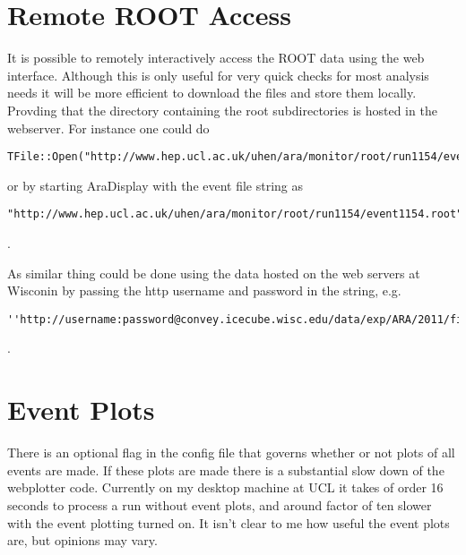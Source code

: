 \documentclass[letterpaper]{article}  %
\begin{document}
\section{Remote ROOT Access}
It is possible to remotely interactively access the ROOT data using the web interface. Although this is only useful for very quick checks for most analysis needs it will be more efficient to download the files and store them locally. Provding that the directory containing the root subdirectories is hosted in the webserver. For instance one could do \\ \begin{verbatim}TFile::Open("http://www.hep.ucl.ac.uk/uhen/ara/monitor/root/run1154/event1154.root")\end{verbatim} or by starting AraDisplay with the event file string as \begin{verbatim}"http://www.hep.ucl.ac.uk/uhen/ara/monitor/root/run1154/event1154.root"\end{verbatim}. 

As similar thing could be done using the data hosted on the web servers at Wisconin by passing the http username and password in the string, e.g. \begin{verbatim}''http://username:password@convey.icecube.wisc.edu/data/exp/ARA/2011/filtered/L0/0205/run001669.root''\end{verbatim}.


\section{Event Plots}
There is an optional flag in the config file that governs whether or not plots of all events are made. If these plots are made there is a substantial slow down of the webplotter code. Currently on my desktop machine at UCL it takes of order 16 seconds to process a run without event plots, and around factor of ten slower with the event plotting turned on. It isn't clear to me how useful the event plots are, but opinions may vary.
\end{document}
